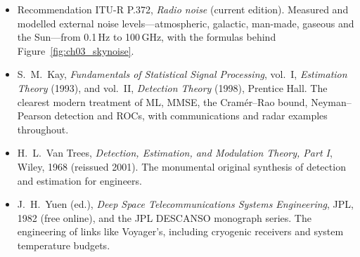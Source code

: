 \begin{itemize}
\item Recommendation ITU-R P.372, \emph{Radio noise} (current edition). Measured and modelled external noise
levels---atmospheric, galactic, man-made, gaseous and the Sun---from 0.1\,Hz to 100\,GHz, with the formulas
behind Figure~\ref{fig:ch03_skynoise}.
\item S.~M.~Kay, \emph{Fundamentals of Statistical Signal Processing}, vol.~I, \emph{Estimation Theory} (1993),
and vol.~II, \emph{Detection Theory} (1998), Prentice Hall. The clearest modern treatment of ML, MMSE, the
Cram\'er--Rao bound, Neyman--Pearson detection and ROCs, with communications and radar examples throughout.
\item H.~L.~Van Trees, \emph{Detection, Estimation, and Modulation Theory, Part I}, Wiley, 1968 (reissued
2001). The monumental original synthesis of detection and estimation for engineers.
\item J.~H.~Yuen (ed.), \emph{Deep Space Telecommunications Systems Engineering}, JPL, 1982 (free online), and
the JPL DESCANSO monograph series. The engineering of links like Voyager's, including cryogenic receivers and
system temperature budgets.
\end{itemize}
